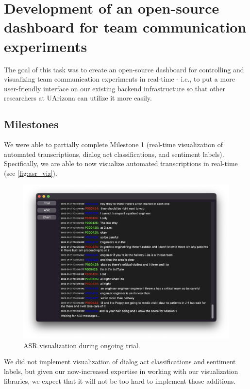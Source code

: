 \chapter{Development of an open-source dashboard for team communication experiments}

The goal of this task was to create an open-source dashboard for controlling
and visualizing team communication experiments in real-time - i.e., to put a
more user-friendly interface on our existing backend infrastructure so that
other researchers at UArizona can utilize it more easily.

\section{Milestones}

We were able to partially complete Milestone 1 (real-time visualization of
automated transcriptions, dialog act classifications, and sentiment labels).
Specifically, we are able to now visualize automated transcriptions in
real-time (see \autoref{fig:asr_viz}).

\begin{figure}
    \centering
    \includegraphics[width=\textwidth]{figures/asr_viz}
    \caption{ASR visualization during ongoing trial.}
    \label{fig:asr_viz}
\end{figure}

We did not implement visualization of dialog act classifications and sentiment
labels, but given our now-increased expertise in working with our visualization
libraries, we expect that it will not be too hard to implement those additions. 

